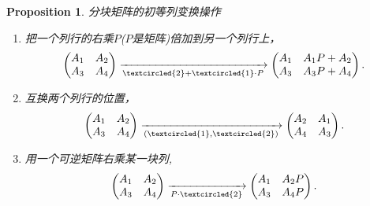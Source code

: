 \documentclass{article}
\newtheorem{proposition}[theorem]{Proposition}
\begin{document}
\begin{proposition}
\rm 分块矩阵的初等列变换操作
\begin{enumerate}
	\item 把一个列行的{\color{red}右乘}$P$($P$是矩阵)倍加到另一个列行上，
	$$
	\begin{pmatrix}
	A_1 & A_2 \\
	A_3 & A_4
	\end{pmatrix}\xrightarrow[\tiny\textcircled{2} +  \tiny\textcircled{1}\cdot P ]{} 
	\begin{pmatrix}
	A_1 & A_1P+ A_2 \\
	A_3 & A_3P +A_4  
	\end{pmatrix}.
	$$
	\item 互换两个列行的位置，
	$$
	\begin{pmatrix}
	A_1 & A_2 \\
	A_3 & A_4
	\end{pmatrix}\xrightarrow[(\tiny\textcircled{1} ,  \tiny\textcircled{2})]{}
	\begin{pmatrix}
	A_2 & A_1 \\
	A_4 & A_3   
	\end{pmatrix}.
	$$
	\item 用一个可逆矩阵{\color{red}右乘}某一块列,
	$$
	\begin{pmatrix}
	A_1 & A_2 \\
	A_3 & A_4
	\end{pmatrix}\xrightarrow[P\cdot \tiny\textcircled{2}]{} 
	\begin{pmatrix}
	A_1 & A_2P \\
	A_3 & A_4P   
	\end{pmatrix}.
	$$
\end{enumerate}
\end{proposition}
\end{document}

